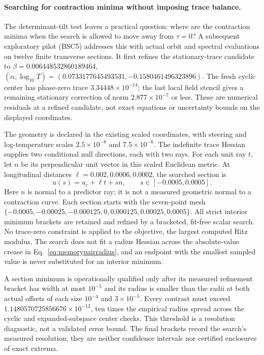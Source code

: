 \documentclass[11pt,letterpaper]{article}
\begin{document}
\paragraph{Searching for contraction minima without imposing trace balance.}
The determinant-tilt test leaves a practical question: where are the contraction minima when the search is
allowed to move away from $\tau=0$? A subsequent exploratory pilot (BSC5) addresses this with actual orbit
and spectral evaluations on twelve finite transverse sections. It first refines the stationary-trace candidate
to $\beta=0.006448532860189464$,
$(\alpha,\log_{10}T)=(0.0733177645493531,-0.1580461496323896)$.
The fresh cyclic center has phase-zero trace $3.34448\times10^{-14}$; the last local field stencil gives a
remaining stationary correction of norm $2.877\times10^{-7}$ or less. These are numerical residuals at a
refined candidate, not exact equations or uncertainty bounds on the displayed coordinates.

The geometry is declared in the existing scaled coordinates, with steering and log-temperature scales
$2.5\times10^{-6}$ and $7.5\times10^{-6}$. The indefinite trace Hessian supplies two conditional null
directions, each with two rays. For each unit ray $t$, let $n$ be its perpendicular unit vector in this
scaled Euclidean metric. At longitudinal distances $\ell=0.002,0.0006,0.0002$, the searched section is
\[
 u(s)=u_c+\ell t+sn,\qquad
 s\in[-0.0005,0.0005].
\]
Here $n$ is normal to a predictor ray; it is not a measured geometric normal to a contraction curve.
Each section starts with the seven-point mesh
$\{-0.0005,-0.00025,-0.000125,0,0.000125,0.00025,0.0005\}$.
All strict interior minimum brackets are retained and refined by a bracketed, fit-free scalar search.
No trace-zero constraint is applied to the objective, the largest computed Ritz modulus. The search does not
fit a radius Hessian across the absolute-value crease in Eq.~\eqref{eq:memorypairradius}, and an endpoint
with the smallest sampled value is never substituted for an interior minimum.

A section minimum is operationally qualified only after its measured refinement bracket has width at most
$10^{-5}$ and its radius is smaller than the radii at both actual offsets of each size $10^{-4}$ and
$3\times10^{-5}$. Every contrast must exceed $1.1480570725856676\times10^{-12}$, ten times the empirical
radius spread across the cyclic and expanded-subspace center checks. This threshold is a resolution diagnostic,
not a validated error bound. The final brackets record the search's measured resolution; they are neither
confidence intervals nor certified enclosures of exact extrema.
\end{document}

